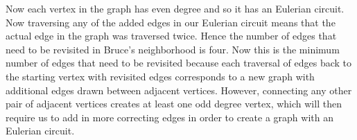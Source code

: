 \documentclass[12pt,twoside]{article}
\begin{document}
\begin{problem}{20}
{Now each vertex in the graph has even degree and so it has an Eulerian circuit.  Now traversing any of the added edges in our Eulerian circuit means that the actual edge in the graph was traversed twice.  Hence the number of edges that need to be revisited in Bruce's neighborhood is four.  Now this is the minimum number of edges that need to be revisited because each traversal of edges back to the starting vertex with revisited edges corresponds to a new graph with additional edges drawn between adjacent vertices.  However, connecting any other pair of adjacent vertices creates at least one odd degree vertex, which will then require us to add in more correcting edges in order to create a graph with an Eulerian circuit.  

}

\end{problem}
\end{document}
